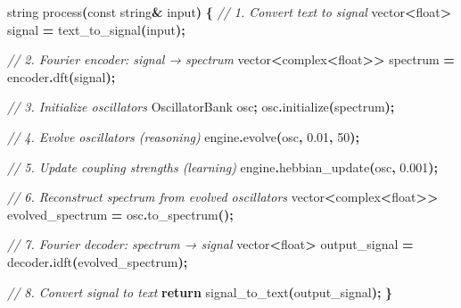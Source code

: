 \documentclass[
  11pt,
  a4paper,
]{article}
\newenvironment{Shaded}{\begin{snugshade}}{\end{snugshade}}
\newcommand{\AttributeTok}[1]{\textcolor[rgb]{0.13,0.29,0.53}{#1}}
\newcommand{\CommentTok}[1]{\textcolor[rgb]{0.56,0.35,0.01}{\textit{#1}}}
\newcommand{\ControlFlowTok}[1]{\textcolor[rgb]{0.13,0.29,0.53}{\textbf{#1}}}
\newcommand{\DataTypeTok}[1]{\textcolor[rgb]{0.13,0.29,0.53}{#1}}
\newcommand{\DecValTok}[1]{\textcolor[rgb]{0.00,0.00,0.81}{#1}}
\newcommand{\FloatTok}[1]{\textcolor[rgb]{0.00,0.00,0.81}{#1}}
\newcommand{\NormalTok}[1]{#1}
\newcommand{\OperatorTok}[1]{\textcolor[rgb]{0.81,0.36,0.00}{\textbf{#1}}}
\begin{document}
\begin{Shaded}
\begin{Highlighting}[]
\NormalTok{string process}\OperatorTok{(}\AttributeTok{const}\NormalTok{ string}\OperatorTok{\&}\NormalTok{ input}\OperatorTok{)} \OperatorTok{\{}
    \CommentTok{// 1. Convert text to signal}
\NormalTok{    vector}\OperatorTok{\textless{}}\DataTypeTok{float}\OperatorTok{\textgreater{}}\NormalTok{ signal }\OperatorTok{=}\NormalTok{ text\_to\_signal}\OperatorTok{(}\NormalTok{input}\OperatorTok{);}
    
    \CommentTok{// 2. Fourier encoder: signal → spectrum}
\NormalTok{    vector}\OperatorTok{\textless{}}\NormalTok{complex}\OperatorTok{\textless{}}\DataTypeTok{float}\OperatorTok{\textgreater{}\textgreater{}}\NormalTok{ spectrum }\OperatorTok{=}\NormalTok{ encoder}\OperatorTok{.}\NormalTok{dft}\OperatorTok{(}\NormalTok{signal}\OperatorTok{);}
    
    \CommentTok{// 3. Initialize oscillators}
\NormalTok{    OscillatorBank osc}\OperatorTok{;}
\NormalTok{    osc}\OperatorTok{.}\NormalTok{initialize}\OperatorTok{(}\NormalTok{spectrum}\OperatorTok{);}
    
    \CommentTok{// 4. Evolve oscillators (reasoning)}
\NormalTok{    engine}\OperatorTok{.}\NormalTok{evolve}\OperatorTok{(}\NormalTok{osc}\OperatorTok{,} \FloatTok{0.01}\OperatorTok{,} \DecValTok{50}\OperatorTok{);}
    
    \CommentTok{// 5. Update coupling strengths (learning)}
\NormalTok{    engine}\OperatorTok{.}\NormalTok{hebbian\_update}\OperatorTok{(}\NormalTok{osc}\OperatorTok{,} \FloatTok{0.001}\OperatorTok{);}
    
    \CommentTok{// 6. Reconstruct spectrum from evolved oscillators}
\NormalTok{    vector}\OperatorTok{\textless{}}\NormalTok{complex}\OperatorTok{\textless{}}\DataTypeTok{float}\OperatorTok{\textgreater{}\textgreater{}}\NormalTok{ evolved\_spectrum }\OperatorTok{=}\NormalTok{ osc}\OperatorTok{.}\NormalTok{to\_spectrum}\OperatorTok{();}
    
    \CommentTok{// 7. Fourier decoder: spectrum → signal}
\NormalTok{    vector}\OperatorTok{\textless{}}\DataTypeTok{float}\OperatorTok{\textgreater{}}\NormalTok{ output\_signal }\OperatorTok{=}\NormalTok{ decoder}\OperatorTok{.}\NormalTok{idft}\OperatorTok{(}\NormalTok{evolved\_spectrum}\OperatorTok{);}
    
    \CommentTok{// 8. Convert signal to text}
    \ControlFlowTok{return}\NormalTok{ signal\_to\_text}\OperatorTok{(}\NormalTok{output\_signal}\OperatorTok{);}
\OperatorTok{\}}
\end{Highlighting}
\end{Shaded}
\end{document}
